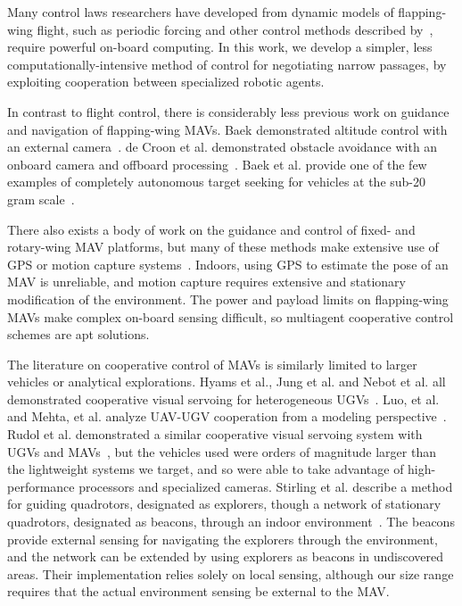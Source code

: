 \documentclass{aamas2013}
\begin{document}
Many control laws researchers have developed from dynamic models of 
flapping-wing flight, such as periodic forcing and other control methods 
described by~\cite{doman:dynamics}\cite{khan:longitudinal_control}\cite{leonard:averaging}, 
require powerful on-board computing. In this work, we develop a simpler, 
less computationally-intensive method of control for negotiating narrow 
passages, by exploiting cooperation between specialized robotic agents.
%

In contrast to flight control, there is considerably less previous work on 
guidance and navigation of flapping-wing MAVs. Baek demonstrated altitude 
control with an external camera~\cite{baek:altitude}. de Croon et al. 
demonstrated obstacle avoidance with an onboard camera and offboard 
processing~\cite{delfly:avoid}. Baek et al. provide one of the few examples 
of completely autonomous target seeking for vehicles at the sub-20 gram 
scale~\cite{baek:tracking}.

There also exists a body of work on the guidance and control of fixed- and 
rotary-wing MAV platforms, but many of these methods make extensive use of 
GPS or motion capture systems~\cite{kanade:3dvision}\cite{kingston:timeattitude}. 
Indoors, using GPS to estimate the pose of an MAV is unreliable, and motion 
capture requires extensive and stationary modification of the environment. 
The power and payload limits on flapping-wing MAVs make complex on-board 
sensing difficult, so multiagent cooperative control schemes are apt 
solutions.

The literature on cooperative control of MAVs is similarly limited to larger
vehicles or analytical explorations. Hyams et al., Jung et al. and Nebot et
al. all demonstrated cooperative visual servoing for heterogeneous
UGVs~\cite{Hyams1999Cooperative}\cite{Jung1998Range}\cite{Nebot2003Agents}.
Luo, et al. and Mehta, et al. analyze UAV-UGV cooperation from a modeling
perspective~\cite{Luo2011Air}\cite{Mehta2006Adaptive}. Rudol et al.
demonstrated a similar cooperative visual servoing system with UGVs and
MAVs~\cite{Rudol2008Micro}, but the vehicles used were orders of magnitude
larger than the lightweight systems we target, and so were able to take
advantage of high-performance processors and specialized cameras. Stirling et
al. describe a method for guiding quadrotors, designated as explorers, though
a network of stationary quadrotors, designated as beacons, through an indoor
environment~\cite{SwarmStirling}. The beacons provide external sensing for
navigating the explorers through the environment, and the network can be
extended by using explorers as beacons in undiscovered areas. Their
implementation relies solely on local sensing, although our size range
requires that the actual environment sensing be external to the MAV.
\end{document}
